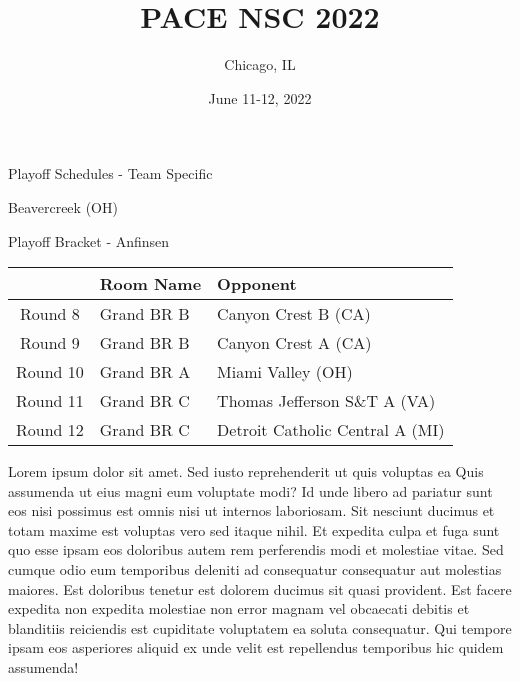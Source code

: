 \documentclass{article}%
\title{PACE NSC 2022}%
\author{Chicago, IL}%
\date{June 11{-}12, 2022}%
\begin{document}
%
\normalsize%
%
\maketitle%
\vspace*{48pt}%
\begin{center}%
\begin{Huge}%
Playoff Schedules {-} Team Specific%
\end{Huge}%
\end{center}%
\newpage%
\begin{center}%
\begin{Huge}%
Beavercreek (OH)%
\end{Huge}%
\vspace*{8pt}%
\linebreak%
\begin{Large}%
Playoff Bracket {-} Anfinsen%
\end{Large}%
\end{center}%
%
\begin{tabularx}{\textwidth}{|c|Y|Y|}%
\hline%
&Room Name&Opponent\\%
\hline%
Round 8&Grand BR B&Canyon Crest B (CA)\\%
Round 9&Grand BR B&Canyon Crest A (CA)\\%
Round 10&Grand BR A&Miami Valley (OH)\\%
Round 11&Grand BR C&Thomas Jefferson S\&T A (VA)\\%
Round 12&Grand BR C&Detroit Catholic Central A (MI)\\%
\hline%
\end{tabularx}%
\vspace*{8pt}%
\linebreak%
\newline%
\newline%
Lorem ipsum dolor sit amet. Sed iusto reprehenderit ut quis voluptas ea Quis assumenda ut eius magni eum voluptate modi? Id unde libero ad pariatur sunt eos nisi possimus est omnis nisi ut internos laboriosam. Sit nesciunt ducimus et totam maxime est voluptas vero sed itaque nihil. Et expedita culpa et fuga sunt quo esse ipsam eos doloribus autem rem perferendis modi et molestiae vitae.\newline%
\newline%
Sed cumque odio eum temporibus deleniti ad consequatur consequatur aut molestias maiores. Est doloribus tenetur est dolorem ducimus sit quasi provident. Est facere expedita non expedita molestiae non error magnam vel obcaecati debitis et blanditiis reiciendis est cupiditate voluptatem ea soluta consequatur. Qui tempore ipsam eos asperiores aliquid ex unde velit est repellendus temporibus hic quidem assumenda!\newline%
\end{document}
